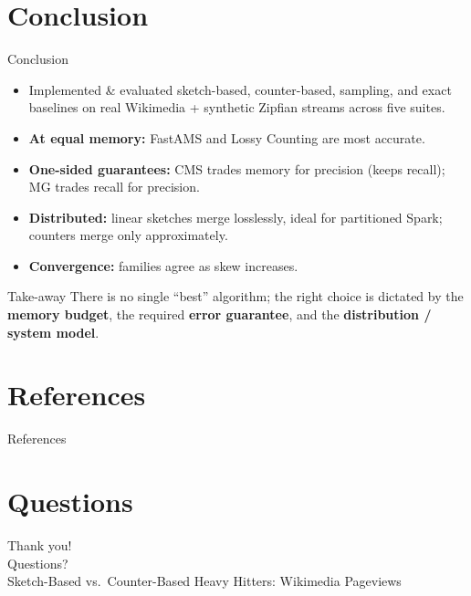 \documentclass[11pt,aspectratio=169]{beamer}
\begin{document}
\section{Conclusion}

\begin{frame}{Conclusion}
  \begin{itemize}
    \item Implemented \& evaluated sketch-based, counter-based, sampling, and exact
          baselines on real Wikimedia + synthetic Zipfian streams across five suites.
    \item \textbf{At equal memory:} FastAMS and Lossy Counting are most accurate.
    \item \textbf{One-sided guarantees:} CMS trades memory for precision (keeps recall);
          MG trades recall for precision.
    \item \textbf{Distributed:} linear sketches merge losslessly, ideal for partitioned Spark;
          counters merge only approximately.
    \item \textbf{Convergence:} families agree as skew increases.
  \end{itemize}
  \vspace{0.5em}
  \begin{alertblock}{Take-away}
    There is no single ``best'' algorithm; the right choice is dictated by the
    \textbf{memory budget}, the required \textbf{error guarantee}, and the
    \textbf{distribution / system model}.
  \end{alertblock}
\end{frame}

\section*{References}

\begin{frame}[allowframebreaks]{References}
  \printbibliography[heading=none]
\end{frame}

\section*{Questions}

\begin{frame}
  \centering
  \vfill
  {\Huge Thank you!}\\[1em]
  {\Large Questions?}\\[2em]
  \small Sketch-Based vs.\ Counter-Based Heavy Hitters: Wikimedia Pageviews
  \vfill
\end{frame}
\end{document}
